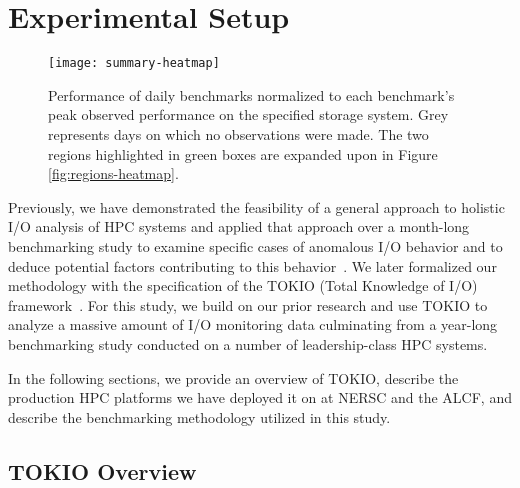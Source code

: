 \section{Experimental Setup}\label{sec:methods}

\begin{figure*}[t]
    \centering
    \texttt{[image: summary-heatmap]}
    \vspace{-.2in}
    \caption{Performance of daily benchmarks normalized to each benchmark's peak observed performance on the specified storage system.  Grey represents days on which no observations were made.  The two regions highlighted in green boxes are expanded upon in Figure \ref{fig:regions-heatmap}.}
    \label{fig:summary-heatmap}
\end{figure*}




Previously, we have demonstrated the feasibility of a general approach to holistic I/O analysis of HPC systems and applied that approach over a month-long benchmarking study to examine specific cases of anomalous I/O behavior and to deduce potential factors contributing to this behavior~\cite{Lockwood2017}. We later formalized our methodology with the specification of the TOKIO (Total Knowledge of I/O) framework~\cite{Lockwood2018tokio}. For this study, we build on our prior research and use TOKIO to analyze a massive amount of I/O monitoring data culminating from a year-long benchmarking study conducted on a number of leadership-class HPC systems. 

In the following sections, we provide an overview of TOKIO, describe the production HPC platforms we have deployed it on at NERSC and the ALCF, and describe the benchmarking methodology  utilized in this study.

\subsection{TOKIO Overview}\label{sec:methods/tokio}

